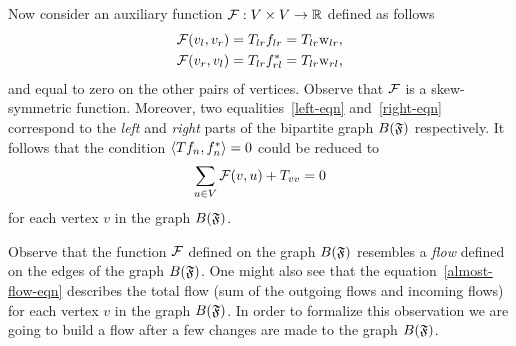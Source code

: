 \documentclass[12pt,oneside,a4paper]{amsart}
\begin{document}
      Now consider an auxiliary function $\mathcal{{F}}: V \times V \to \mathbb{R}$ defined as follows
      \begin{align*}
        &\mathcal{{F}}(v_l, v_r) = T_{lr} f_{lr} = T_{lr} \mathrm{w}_{lr},\\
        &\mathcal{{F}}(v_r, v_l) = T_{lr} f^*_{rl} = T_{lr} \mathrm{w}_{rl},
      \end{align*}
      and equal to zero on the other pairs of vertices.
      Observe that $\mathcal{{F}}$ is a skew-symmetric function.
      Moreover, two equalities~\eqref{left-eqn} and~\eqref{right-eqn} correspond to the \emph{left} and \emph{right}
        parts of the bipartite graph $B(\mathfrak{F})$ respectively.
      It follows that the condition $\langle Tf_n, f_n^* \rangle = 0$ could be reduced to
      \begin{equation}
        \label{almost-flow-eqn}
        \sum_{u \in V} \mathcal{{F}}(v, u) + T_{vv} = 0
      \end{equation}
        for each vertex $v$ in the graph $B(\mathfrak{F})$.
      \begin{remark}
        Observe that the function $\mathcal{{F}}$ defined on the graph $B(\mathfrak{F})$ resembles
          a \emph{flow} defined on the edges of the graph $B(\mathfrak{F})$.
        One might also see that the equation~\eqref{almost-flow-eqn} describes the total flow (sum of the outgoing flows and incoming flows) 
          for each vertex $v$ in the graph $B(\mathfrak{F})$.
        In order to formalize this observation we are going to build a flow
          after a few changes are made to the graph $B(\mathfrak{F})$.
      \end{remark}

    \medskip
\end{document}
